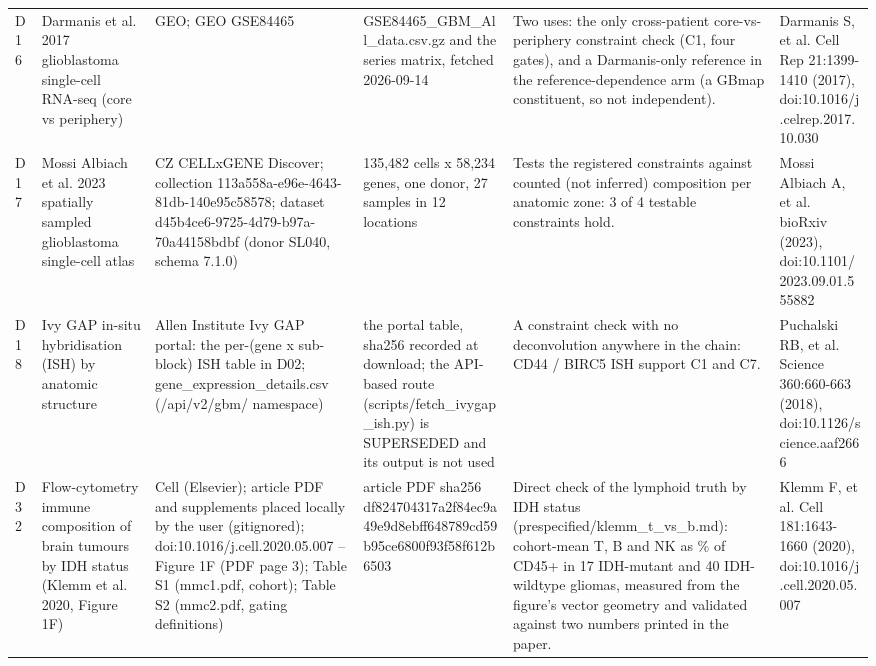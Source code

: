 \begin{table}[htbp]
\begin{tabular}{llllll}
D16 & Darmanis et al. 2017 glioblastoma single-cell RNA-seq (core vs periphery) & GEO; GEO GSE84465 & GSE84465\_GBM\_All\_data.csv.gz and the series matrix, fetched 2026-09-14 & Two uses: the only cross-patient core-vs-periphery constraint check (C1, four gates), and a Darmanis-only reference in the reference-dependence arm (a GBmap constituent, so not independent). & Darmanis S, et al. Cell Rep 21:1399-1410 (2017), doi:10.1016/j.celrep.2017.10.030 \\
D17 & Mossi Albiach et al. 2023 spatially sampled glioblastoma single-cell atlas & CZ CELLxGENE Discover; collection 113a558a-e96e-4643-81db-140e95c58578; dataset d45b4ce6-9725-4d79-b97a-70a44158bdbf (donor SL040, schema 7.1.0) & 135,482 cells x 58,234 genes, one donor, 27 samples in 12 locations & Tests the registered constraints against counted (not inferred) composition per anatomic zone: 3 of 4 testable constraints hold. & Mossi Albiach A, et al. bioRxiv (2023), doi:10.1101/2023.09.01.555882 \\
D18 & Ivy GAP in-situ hybridisation (ISH) by anatomic structure & Allen Institute Ivy GAP portal: the per-(gene x sub-block) ISH table in D02; gene\_expression\_details.csv (/api/v2/gbm/ namespace) & the portal table, sha256 recorded at download; the API-based route (scripts/fetch\_ivygap\_ish.py) is SUPERSEDED and its output is not used & A constraint check with no deconvolution anywhere in the chain: CD44 / BIRC5 ISH support C1 and C7. & Puchalski RB, et al. Science 360:660-663 (2018), doi:10.1126/science.aaf2666 \\
D32 & Flow-cytometry immune composition of brain tumours by IDH status (Klemm et al. 2020, Figure 1F) & Cell (Elsevier); article PDF and supplements placed locally by the user (gitignored); doi:10.1016/j.cell.2020.05.007 -- Figure 1F (PDF page 3); Table S1 (mmc1.pdf, cohort); Table S2 (mmc2.pdf, gating definitions) & article PDF sha256 df824704317a2f84ec9a49e9d8ebff648789cd59b95ce6800f93f58f612b6503 & Direct check of the lymphoid truth by IDH status (prespecified/klemm\_t\_vs\_b.md): cohort-mean T, B and NK as \% of CD45+ in 17 IDH-mutant and 40 IDH-wildtype gliomas, measured from the figure's vector geometry and validated against two numbers printed in the paper. & Klemm F, et al. Cell 181:1643-1660 (2020), doi:10.1016/j.cell.2020.05.007 \\

\end{tabular}
\end{table}

